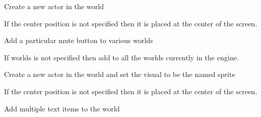 \documentclass[letterpaper,10pt,english]{sphinxmanual}
\begin{document}

\begin{fulllineitems}
\label{blocks:serge.blocks.utils.addActorToWorld}
Create a new actor in the world

If the center position is not specified then it is placed at the center of the screen.

\end{fulllineitems}


\begin{fulllineitems}
\label{blocks:serge.blocks.utils.addMuteButtonToWorlds}
Add a particular mute button to various worlds

If worlds is not specified then add to all the worlds currently in the engine.

\end{fulllineitems}


\begin{fulllineitems}
\label{blocks:serge.blocks.utils.addSpriteActorToWorld}
Create a new actor in the world and set the visual to be the named sprite

If the center position is not specified then it is placed at the center of the screen.

\end{fulllineitems}


\begin{fulllineitems}
\label{blocks:serge.blocks.utils.addTextItemsToWorld}
Add multiple text items to the world

\end{fulllineitems}
\end{document}
